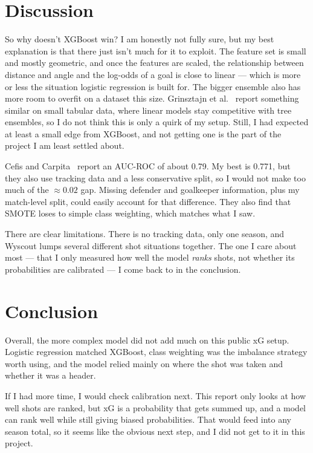\documentclass[journal]{vgtc}                %
\begin{document}
\section{Discussion}

So why doesn't XGBoost win? I am honestly not fully sure, but my best
explanation is that there just isn't much for it to exploit. The feature
set is small and mostly geometric, and once the features are scaled, the
relationship between distance and angle and the log-odds of a goal is
close to linear --- which is more or less the situation logistic
regression is built for. The bigger ensemble also has more room to
overfit on a dataset this size. Grinsztajn et al.~\cite{grinsztajn2022tabular}
report something similar on small tabular data, where linear models stay
competitive with tree ensembles, so I do not think this is only a quirk of
my setup. Still, I had expected at least a small edge from XGBoost, and
not getting one is the part of the project I am least settled about.

Cefis and Carpita~\cite{xgSerieA2024} report an AUC-ROC of about 0.79.
My best is 0.771, but they also use tracking data and a less conservative
split, so I would not make too much of the $\approx 0.02$ gap. Missing
defender and goalkeeper information, plus my match-level split, could
easily account for that difference. They also find that SMOTE loses to
simple class weighting, which matches what I saw.

There are clear limitations. There is no tracking data, only one season,
and Wyscout lumps several different shot situations together. The one I
care about most --- that I only measured how well the model \emph{ranks}
shots, not whether its probabilities are calibrated --- I come back to in
the conclusion.

\section{Conclusion}

Overall, the more complex model did not add much on this public xG setup.
Logistic regression matched XGBoost, class weighting was the imbalance
strategy worth using, and the model relied mainly on where the shot was
taken and whether it was a header.

If I had more time, I would check calibration next. This report only looks
at how well shots are ranked, but xG is a probability that gets summed up,
and a model can rank well while still giving biased probabilities. That
would feed into any season total, so it seems like the obvious next step,
and I did not get to it in this project.
\end{document}
